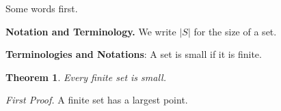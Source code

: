 \documentclass{article}
\newtheorem{theorem}{Theorem}
\begin{document}
Some words first.

{\bf Notation and Terminology.} We write $|S|$ for the size of a set.

{\bf Terminologies and Notations}: A set is small if it is finite.

\begin{theorem}
Every finite set is small.
\end{theorem}

\textit{First Proof.} A finite set has a largest point.
\end{document}
